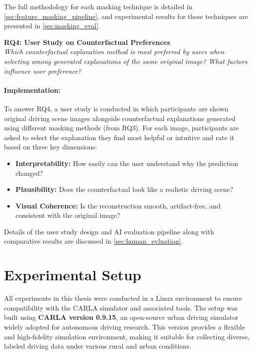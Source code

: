 The full methodology for each masking technique is detailed in \cref{sec:feature_masking_pipeline}, and experimental results for these techniques are presented in \cref{sec:masking_eval}.

\vspace{1em}

\textbf{RQ4: User Study on Counterfactual Preferences}  \\
\textit{Which counterfactual explanation method is most preferred by users when selecting among generated explanations of the same original image? What factors influence user preference?}

\vspace{-1em}

\paragraph{Implementation:}To answer RQ4, a user study is conducted in which participants are shown original driving scene images alongside counterfactual explanations generated using different masking methods (from RQ3). For each image, participants are asked to select the explanation they find most helpful or intuitive and rate it based on three key dimensions:

\begin{itemize}
    \item \textbf{Interpretability:} How easily can the user understand why the prediction changed?
    \item \textbf{Plausibility:} Does the counterfactual look like a realistic driving scene?
    \item \textbf{Visual Coherence:} Is the reconstruction smooth, artifact-free, and consistent with the original image?
\end{itemize}

Details of the user study design and AI evaluation pipeline along with comparative results are discussed in \cref{sec:human_evluation}.

\section{Experimental Setup}

All experiments in this thesis were conducted in a Linux environment to ensure compatibility with the CARLA simulator and associated tools. The setup was built using \textbf{CARLA version 0.9.15}, an open-source urban driving simulator widely adopted for autonomous driving research. This version provides a flexible and high-fidelity simulation environment, making it suitable for collecting diverse, labeled driving data under various rural and urban conditions.

